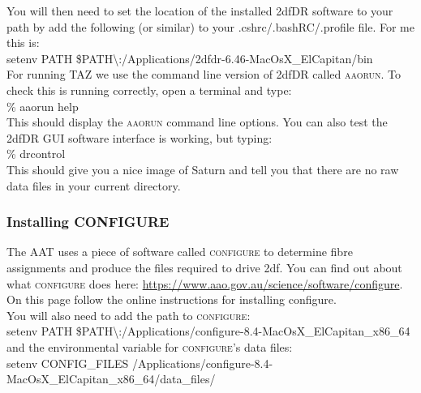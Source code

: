 \documentclass[12pt]{article}
\begin{document}
You will then need to set the location of the installed 2dfDR software to your path by add the following (or similar) to your .cshrc/.bashRC/.profile file. For me this is: \\


\hspace{10mm} setenv PATH \$PATH\textbackslash:/Applications/2dfdr-6.46-MacOsX\_ElCapitan/bin \\

For running \textsc{TAZ} we use the command line version of 2dfDR called \textsc{aaorun}. To check this is running correctly, open a terminal and type: \\

\hspace{10mm} \% aaorun help\\

This should display the  \textsc{aaorun} command line options. You can also test the 2dfDR GUI software interface is working, but typing: \\

 
\hspace{10mm} \% drcontrol\\

This should give you a nice image of Saturn and tell you that there are no raw data files in your current directory.

\subsubsection{Installing CONFIGURE}

The AAT uses a piece of software called \textsc{configure} to determine fibre assignments and produce the files required to drive 2df. You can find out about what \textsc{configure} does here: \url{https://www.aao.gov.au/science/software/configure}. On this page follow the online instructions for installing configure.  \\

You will also need to add the path to \textsc{configure}:\\

\hspace{10mm} setenv PATH \$PATH\textbackslash:/Applications/configure-8.4-MacOsX\_ElCapitan\_x86\_64\\

and the environmental variable for \textsc{configure}'s data files:\\

\hspace{10mm}  setenv CONFIG\_FILES /Applications/configure-8.4-MacOsX\_ElCapitan\_x86\_64/data\_files/\\
\end{document}
